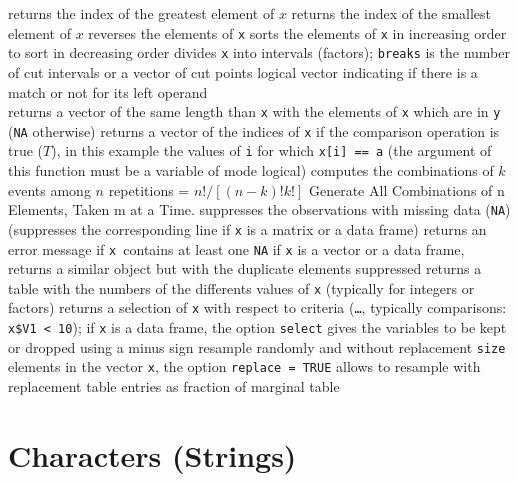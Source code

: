 {	{ returns the index of the greatest element of $x$}
	{ returns the index of the smallest element of $x$}
	{ reverses the elements of {\tt x}}
	{sorts the elements of {\tt x} in increasing order}
	{to sort in decreasing order}
	{divides {\tt x} into intervals (factors); {\tt breaks} is the number of cut intervals or a vector of cut points}
	{logical vector indicating if there is a match or not for its left operand\\}
	{returns a vector of the same length than {\tt x}
    with the elements of {\tt x} which are in {\tt y} ({\tt NA}
    otherwise)}
	{returns a vector of the indices of {\tt x} if the
comparison operation is true ($T$), in this example the values of {\tt i} for
which {\tt x[i] == a} (the argument of this function must be a variable of mode
logical)}
	{ computes the combinations of $k$ events among $n$ repetitions = $n!/[(n-k)!k!]$}
	{ Generate All Combinations of n Elements, Taken m at a Time.}
	{suppresses the observations with missing data ({\tt NA}) (suppresses the corresponding line if {\tt x} is a matrix or a data frame)}
	{returns an error message if {\tt x }contains at least one {\tt NA}}
	{if {\tt x} is a vector or a data frame, returns a similar object but with the duplicate elements suppressed}
	{returns a table with the numbers of the differents values of {\tt x} (typically for integers or factors)}
	{returns a selection of {\tt x} with respect to criteria ({\tt \ldots}, typically comparisons: {\tt x\$V1 < 10}); if {\tt x} is a data frame, the option {\tt select} gives the variables to be kept or dropped using a minus sign}
	{resample randomly and without replacement {\tt size}
elements in the vector {\tt x}, the option {\tt replace = TRUE} allows to
resample with replacement}
	{table entries as fraction of marginal table}

\section{Characters (Strings)}{}

}
